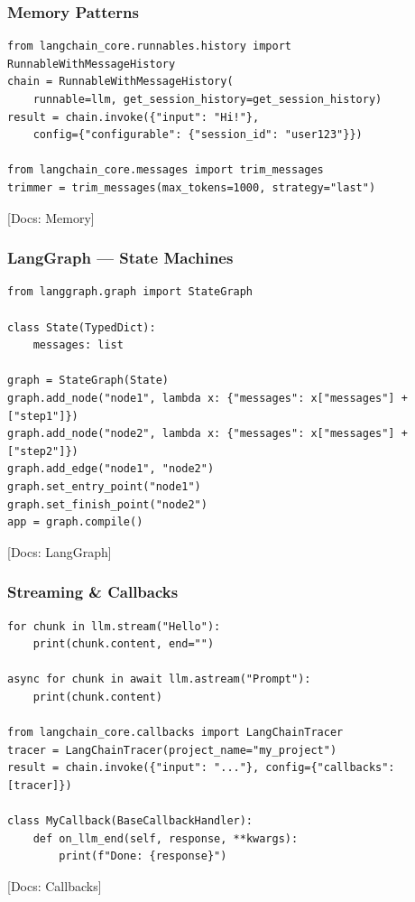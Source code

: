 \documentclass[aspectratio=169,11pt]{beamer}
\newcommand{\docref}[1]{{\scriptsize\color{docgray}[Docs: #1]}}
\begin{document}
\begin{frame}[fragile]
  \frametitle{Memory Patterns}
\vspace{-0.3cm}

  \begin{lstlisting}[basicstyle=\ttfamily\tiny]
from langchain_core.runnables.history import RunnableWithMessageHistory
chain = RunnableWithMessageHistory(
    runnable=llm, get_session_history=get_session_history)
result = chain.invoke({"input": "Hi!"},
    config={"configurable": {"session_id": "user123"}})

from langchain_core.messages import trim_messages
trimmer = trim_messages(max_tokens=1000, strategy="last")
  \end{lstlisting}
\vspace{-0.35cm}

  \docref{Memory}
\end{frame}

\begin{frame}[fragile]
  \frametitle{LangGraph — State Machines}
\vspace{-0.3cm}

  \begin{lstlisting}[basicstyle=\ttfamily\tiny]
from langgraph.graph import StateGraph

class State(TypedDict):
    messages: list

graph = StateGraph(State)
graph.add_node("node1", lambda x: {"messages": x["messages"] + ["step1"]})
graph.add_node("node2", lambda x: {"messages": x["messages"] + ["step2"]})
graph.add_edge("node1", "node2")
graph.set_entry_point("node1")
graph.set_finish_point("node2")
app = graph.compile()
  \end{lstlisting}
\vspace{-0.35cm}

  \docref{LangGraph}
\end{frame}

\begin{frame}[fragile]
  \frametitle{Streaming \& Callbacks}
\vspace{-0.3cm}

  \begin{lstlisting}[basicstyle=\ttfamily\tiny]
for chunk in llm.stream("Hello"):
    print(chunk.content, end="")

async for chunk in await llm.astream("Prompt"):
    print(chunk.content)

from langchain_core.callbacks import LangChainTracer
tracer = LangChainTracer(project_name="my_project")
result = chain.invoke({"input": "..."}, config={"callbacks": [tracer]})

class MyCallback(BaseCallbackHandler):
    def on_llm_end(self, response, **kwargs):
        print(f"Done: {response}")
  \end{lstlisting}
\vspace{-0.35cm}

  \docref{Callbacks}
\end{frame}
\end{document}
